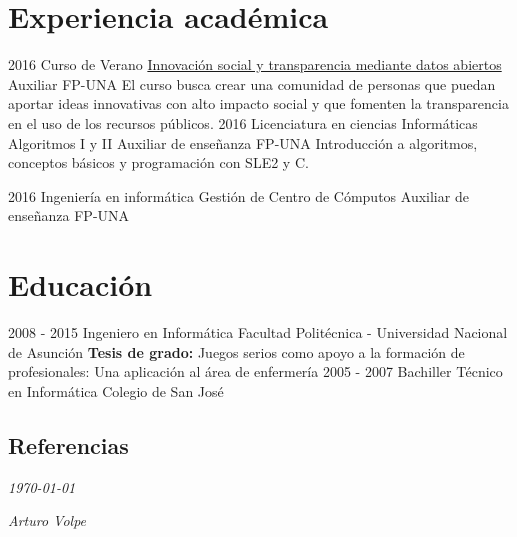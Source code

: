 \documentclass[]{friggeri-cv}
\begin{document}
\section{Experiencia académica}
\clase
    {2016}
    {Curso de Verano}
    {\href{http://www.pol.una.py/cursosverano/index.php?option=com_content&view=article&layout=edit&id=91}{Innovación
            social y transparencia mediante datos abiertos}} 
    {Auxiliar}
    {FP-UNA}
    {El curso busca crear una comunidad de personas que puedan aportar ideas
        innovativas con alto impacto social y que fomenten la transparencia en
        el uso de los recursos públicos. }
\clase
    {2016}
    {Licenciatura en ciencias Informáticas}
    {Algoritmos I y II} 
    {Auxiliar de enseñanza}
    {FP-UNA}
    {Introducción a algoritmos, conceptos básicos y programación con SLE2 y C.}

\clase
    {2016}
    {Ingeniería en informática}
    {Gestión de Centro de Cómputos} 
    {Auxiliar de enseñanza}
    {FP-UNA}
    {}

\section{Educación}
\begin{entrylist}
  \educacion
    {2008 - 2015}
    {Ingeniero en Informática}
    {Facultad Politécnica - Universidad Nacional de Asunción}
    {\textbf{Tesis de grado:} Juegos serios como apoyo a la formación de profesionales: Una aplicación al área de enfermería}
  \educacion
    {2005 - 2007}
    {Bachiller Técnico en Informática}
    {Colegio de San José}
    {}
\end{entrylist}

\begin{absolutelynopagebreak}
\section{Referencias}
\begin{entrylist}
\end{entrylist}
\end{absolutelynopagebreak}

\begin{flushleft}
    \emph{\today{}}
\end{flushleft}
\begin{flushright}
    \emph{Arturo Volpe}
\end{flushright}
\end{document}
